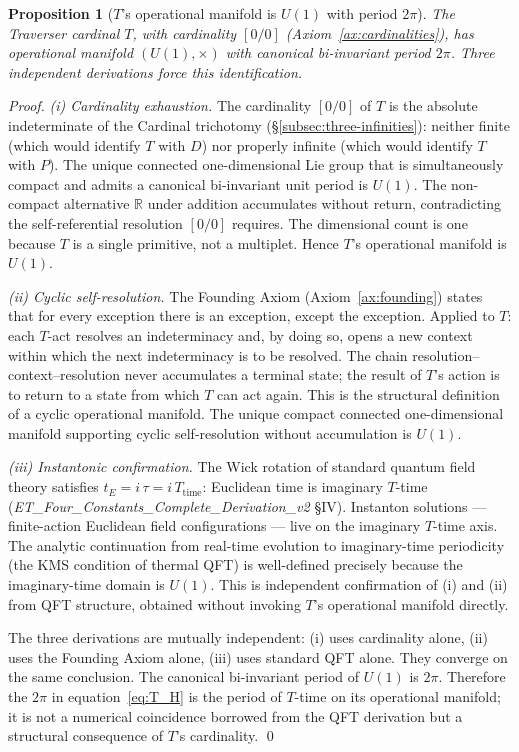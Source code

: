 \documentclass[11pt,a4paper]{article}
\newtheorem{proposition}[theorem]{Proposition}
\theoremstyle{definition}
\theoremstyle{remark}
\begin{document}
\begin{proposition}[$T$'s operational manifold is $U(1)$ with period $2\pi$]\label{prop:U1-period}
The Traverser cardinal $T$, with cardinality $[0/0]$ (Axiom~\ref{ax:cardinalities}), has operational manifold $(U(1),\times)$ with canonical bi-invariant period $2\pi$. Three independent derivations force this identification.
\end{proposition}

\begin{proof}
\emph{(i) Cardinality exhaustion.} The cardinality $[0/0]$ of $T$ is the absolute indeterminate of the Cardinal trichotomy (\S\ref{subsec:three-infinities}): neither finite (which would identify $T$ with $D$) nor properly infinite (which would identify $T$ with $P$). The unique connected one-dimensional Lie group that is simultaneously compact and admits a canonical bi-invariant unit period is $U(1)$. The non-compact alternative $\mathbb{R}$ under addition accumulates without return, contradicting the self-referential resolution $[0/0]$ requires. The dimensional count is one because $T$ is a single primitive, not a multiplet. Hence $T$'s operational manifold is $U(1)$.

\emph{(ii) Cyclic self-resolution.} The Founding Axiom (Axiom~\ref{ax:founding}) states that for every exception there is an exception, except the exception. Applied to $T$: each $T$-act resolves an indeterminacy and, by doing so, opens a new context within which the next indeterminacy is to be resolved. The chain resolution--context--resolution never accumulates a terminal state; the result of $T$'s action is to return to a state from which $T$ can act again. This is the structural definition of a cyclic operational manifold. The unique compact connected one-dimensional manifold supporting cyclic self-resolution without accumulation is $U(1)$.

\emph{(iii) Instantonic confirmation.} The Wick rotation of standard quantum field theory satisfies $t_{E} = i\,\tau = i\,T_{\text{time}}$: Euclidean time is imaginary $T$-time (\textit{ET\_Four\_Constants\_Complete\_Derivation\_v2} \S IV). Instanton solutions --- finite-action Euclidean field configurations --- live on the imaginary $T$-time axis. The analytic continuation from real-time evolution to imaginary-time periodicity (the KMS condition of thermal QFT) is well-defined precisely because the imaginary-time domain is $U(1)$. This is independent confirmation of (i) and (ii) from QFT structure, obtained without invoking $T$'s operational manifold directly.

The three derivations are mutually independent: (i) uses cardinality alone, (ii) uses the Founding Axiom alone, (iii) uses standard QFT alone. They converge on the same conclusion. The canonical bi-invariant period of $U(1)$ is $2\pi$. Therefore the $2\pi$ in equation~\eqref{eq:T_H} is the period of $T$-time on its operational manifold; it is not a numerical coincidence borrowed from the QFT derivation but a structural consequence of $T$'s cardinality. \qed
\end{proof}
\end{document}
